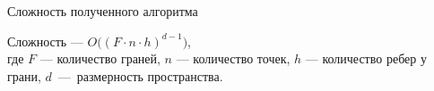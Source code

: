 \documentclass[]{beamer} %
\begin{document}
\begin{frame}{Сложность полученного алгоритма}

    Сложность --- $O\big((F\cdot n\cdot h)^{d-1}\big)$,\\
    где $F$ --- количество граней, $n$ --- количество точек, $h$ --- количество ребер у грани, $d$~---~размерность пространства.


\end{frame}
\end{document}
